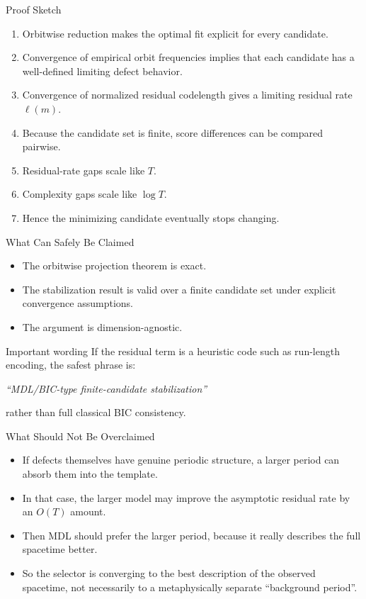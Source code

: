 \documentclass[aspectratio=169]{beamer}
\begin{document}
\begin{frame}{Proof Sketch}
  \begin{enumerate}
    \item Orbitwise reduction makes the optimal fit explicit for every candidate.
    \item Convergence of empirical orbit frequencies implies that each candidate has a well-defined limiting defect behavior.
    \item Convergence of normalized residual codelength gives a limiting residual rate $\ell(m)$.
    \item Because the candidate set is finite, score differences can be compared pairwise.
    \item Residual-rate gaps scale like $T$.
    \item Complexity gaps scale like $\log T$.
    \item Hence the minimizing candidate eventually stops changing.
  \end{enumerate}
\end{frame}

\begin{frame}{What Can Safely Be Claimed}
  \begin{itemize}
    \item The orbitwise projection theorem is exact.
    \item The stabilization result is valid over a finite candidate set under explicit convergence assumptions.
    \item The argument is dimension-agnostic.
  \end{itemize}

  \begin{alertblock}{Important wording}
    If the residual term is a heuristic code such as run-length encoding, the safest phrase is:
    \begin{center}
      \emph{``MDL/BIC-type finite-candidate stabilization''}
    \end{center}
    rather than full classical BIC consistency.
  \end{alertblock}
\end{frame}

\begin{frame}{What Should Not Be Overclaimed}
  \begin{itemize}
    \item If defects themselves have genuine periodic structure, a larger period can absorb them into the template.
    \item In that case, the larger model may improve the asymptotic residual rate by an $O(T)$ amount.
    \item Then MDL should prefer the larger period, because it really describes the full spacetime better.
    \item So the selector is converging to the best description of the observed spacetime, not necessarily to a metaphysically separate ``background period''.
  \end{itemize}
\end{frame}
\end{document}

